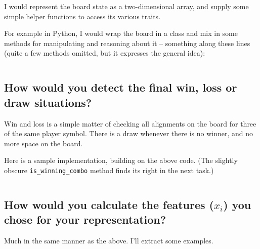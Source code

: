 \documentclass[11pt,a4paper]{article}
\begin{document}
      I would represent the board state as a two-dimensional array, and supply some simple helper functions to access its various traits.
      
      For example in Python, I would wrap the board in a class and mix in some methods for manipulating and reasoning about it -- something along these lines (quite a few methods omitted, but it expresses the general idea):
      
      \inputminted[lastline=42,linenos=true]{python}{src/board.py}
    
    
    \subsection{How would you detect the final win, loss or draw situations?} %
    \label{sub:how_would_you_detect_the_final_win_loss_or_draw_situations}
    
      Win and loss is a simple matter of checking all alignments on the board for three of the same player symbol.
      There is a draw whenever there is no winner, and no more space on the board.
      
      Here is a sample implementation, building on the above code. (The slightly obscure \texttt{is_winning_combo} method finds its right in the next task.)
      
      \inputminted[firstline=44,firstnumber=44,lastline=72,linenos=true]{python}{src/board.py}
    
  
    \subsection{How would you calculate the features ($x_i$) you chose for your representation?} %
    \label{sub:how_would_you_calculate_the_features_x_i_you_chose_for_your_representation_}
    
      Much in the same manner as the above. I'll extract some examples.
      
      \inputminted[firstline=74,firstnumber=74,lastline=99,linenos=true]{python}{src/board.py}
    
    
\end{document}
